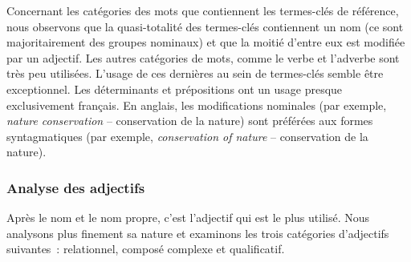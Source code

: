       Concernant les catégories des mots que contiennent les termes-clés de
      référence, nous observons que la quasi-totalité des termes-clés
      contiennent un nom (ce sont majoritairement des groupes nominaux) et
      que la moitié d'entre eux est modifiée par un adjectif. Les autres
      catégories de mots, comme le verbe et l'adverbe sont très peu utilisées.
      L'usage de ces dernières au sein de termes-clés semble être exceptionnel.
      Les déterminants et prépositions ont un usage presque exclusivement
      français. En anglais, les modifications nominales (par exemple,
      \textit{\og{}nature conservation\fg{}} -- \og{}conservation de la
      nature\fg{}) sont préférées aux formes syntagmatiques (par exemple,
      \textit{\og{}conservation of nature\fg{}} -- \og{}conservation de la
      nature\fg{}).

      \subsubsection{Analyse des adjectifs}
      \label{subsubsec:main:domain_independent_keyphrase_extraction-keyphrase_candidate_selection-analysis_of_keyphrase_properties-adjective_analysis}
      Après le nom et le nom propre, c'est l'adjectif qui est le plus utilisé.
      Nous analysons plus finement sa nature et examinons les trois catégories
      d'adjectifs suivantes~: relationnel, composé complexe et qualificatif.
      
